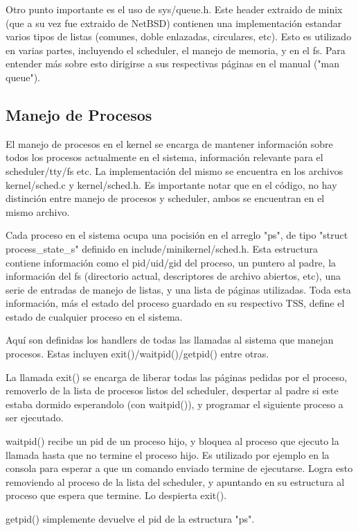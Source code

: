 Otro punto importante es el uso de sys/queue.h. Este header extraido de minix
(que a su vez fue extraido de NetBSD) contienen una implementación estandar
varios tipos de listas (comunes, doble enlazadas, circulares, etc). Esto es
utilizado en varias partes, incluyendo el scheduler, el manejo de memoria, y en
el fs. Para entender más sobre esto dirigirse a sus respectivas páginas en el
manual ("man queue").

\subsection{Manejo de Procesos}

El manejo de procesos en el kernel se encarga de mantener información sobre
todos los procesos actualmente en el sistema, información relevante para el
scheduler/tty/fs etc. La implementación del mismo se encuentra en los archivos
kernel/sched.c y kernel/sched.h. Es importante notar que en el código, no hay
distinción entre manejo de procesos y scheduler, ambos se encuentran en el
mismo archivo.

Cada proceso en el sistema ocupa una pocisión en el arreglo "ps", de tipo
"struct process\_state\_s" definido en include/minikernel/sched.h. Esta
estructura contiene información como el pid/uid/gid del proceso, un puntero al
padre, la información del fs (directorio actual, descriptores de archivo
abiertos, etc), una serie de entradas de manejo de listas, y una lista de
páginas utilizadas. Toda esta información, más el estado del proceso guardado
en su respectivo TSS, define el estado de cualquier proceso en el sistema.

Aquí son definidas los handlers de todas las llamadas al sistema que manejan
procesos. Estas incluyen exit()/waitpid()/getpid() entre otras.

La llamada exit() se encarga de liberar todas las páginas pedidas por el
proceso, removerlo de la lista de procesos listos del scheduler, despertar al
padre si este estaba dormido esperandolo (con waitpid()), y programar el
siguiente proceso a ser ejecutado.

waitpid() recibe un pid de un proceso hijo, y bloquea al proceso que ejecuto la
llamada hasta que no termine el proceso hijo. Es utilizado por ejemplo en la
consola para esperar a que un comando enviado termine de ejecutarse. Logra esto
removiendo al proceso de la lista del scheduler, y apuntando en su estructura
al proceso que espera que termine. Lo despierta exit().

getpid() simplemente devuelve el pid de la estructura "ps".

